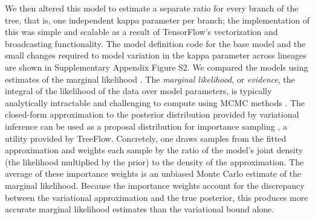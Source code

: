 \documentclass[oupdraft]{sysbio_sse}
\let\cite\citep
\begin{document}
We then altered this model to estimate a separate ratio for every branch of the tree, that is, one independent kappa parameter per branch; the implementation of this was simple and scalable as a result of TensorFlow's vectorization and broadcasting functionality. The model definition code for the base model and the small changes required to model variation in the kappa parameter across lineages are shown in Supplementary Appendix Figure S2. We compared the models using estimates of the marginal likelihood \cite{mackay2003information}. The \textit{marginal likelihood}, or \textit{evidence}, the integral of the likelihood of the data over model parameters, is typically analytically intractable and challenging to compute using MCMC methods \cite{xie2011improving}. The closed-form approximation to the posterior distribution provided by variational inference can be used as a proposal distribution for importance sampling \cite{burda2015importance}, a utility provided by TreeFlow. Concretely, one draws samples from the fitted approximation and weights each sample by the ratio of the model's joint density (the likelihood multiplied by the prior) to the density of the approximation. The average of these importance weights is an unbiased Monte Carlo estimate of the marginal likelihood. Because the importance weights account for the discrepancy between the variational approximation and the true posterior, this produces more accurate marginal likelihood estimates than the variational bound alone.
\end{document}
